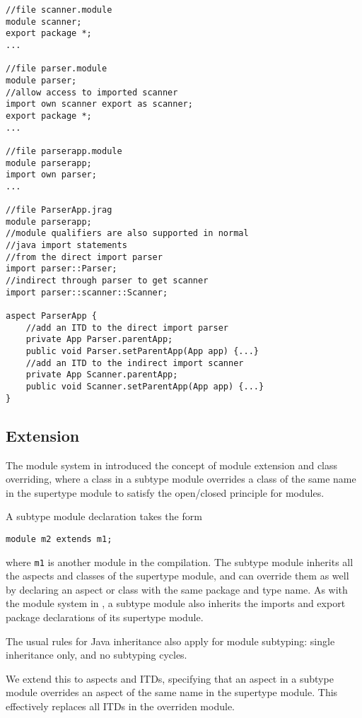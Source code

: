 \begin{lstlisting}
//file scanner.module
module scanner;
export package *;
...

//file parser.module
module parser;
//allow access to imported scanner
import own scanner export as scanner;
export package *;
...

//file parserapp.module
module parserapp;
import own parser;
...

//file ParserApp.jrag
module parserapp;
//module qualifiers are also supported in normal
//java import statements
//from the direct import parser
import parser::Parser;
//indirect through parser to get scanner
import parser::scanner::Scanner;

aspect ParserApp {
	//add an ITD to the direct import parser
	private App Parser.parentApp;
	public void Parser.setParentApp(App app) {...}
	//add an ITD to the indirect import scanner
	private App Scanner.parentApp;
	public void Scanner.setParentApp(App app) {...}
}
\end{lstlisting}

\subsection{Extension}

The module system in \cite{modulesastypes} introduced the concept of
module extension and class overriding, where a class in a subtype module
overrides a class of the same name in the supertype module to satisfy the 
open/closed principle for modules.

A subtype module declaration takes the form
\begin{lstlisting}
module m2 extends m1;
\end{lstlisting}
where \texttt{m1} is another module in the compilation. The subtype module
inherits all the aspects and classes of the supertype module, and can override
them as well by declaring an aspect or class with the same package and type name.
As with the module system in \cite{modulesastypes}, a subtype module also inherits
the imports and export package declarations of its supertype module.

The usual rules for Java inheritance also apply for module subtyping: single 
inheritance only, and no subtyping cycles.

We extend this to aspects and ITDs, specifying that an aspect in a subtype module
overrides an aspect of the same name in the supertype module. This effectively
replaces all ITDs in the overriden module.

